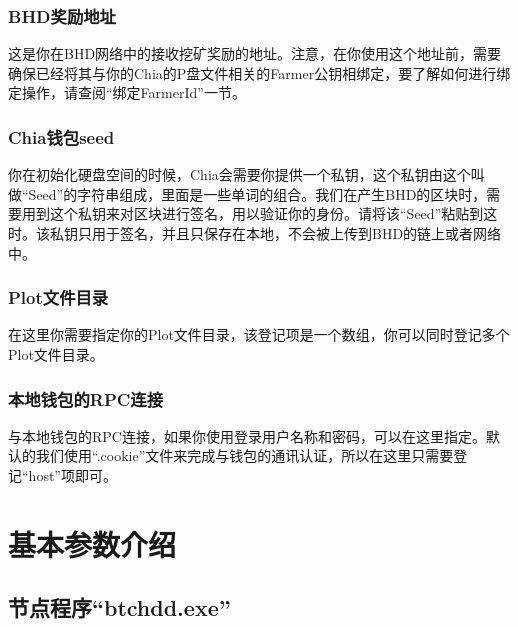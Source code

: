 \subsubsection{BHD奖励地址}
\begin{flushleft}
    这是你在BHD网络中的接收挖矿奖励的地址。注意，在你使用这个地址前，需要确保已经将其与你的Chia的P盘文件相关的Farmer公钥相绑定，要了解如何进行绑定操作，请查阅``绑定FarmerId''一节。
\end{flushleft}
\subsubsection{Chia钱包seed}
\begin{flushleft}
    你在初始化硬盘空间的时候，Chia会需要你提供一个私钥，这个私钥由这个叫做``Seed''的字符串组成，里面是一些单词的组合。我们在产生BHD的区块时，需要用到这个私钥来对区块进行签名，用以验证你的身份。请将该``Seed''粘贴到这时。该私钥只用于签名，并且只保存在本地，不会被上传到BHD的链上或者网络中。
\end{flushleft}
\subsubsection{Plot文件目录}
\begin{flushleft}
    在这里你需要指定你的Plot文件目录，该登记项是一个数组，你可以同时登记多个Plot文件目录。
\end{flushleft}
\subsubsection{本地钱包的RPC连接}
\begin{flushleft}
    与本地钱包的RPC连接，如果你使用登录用户名称和密码，可以在这里指定。默认的我们使用``.cookie''文件来完成与钱包的通讯认证，所以在这里只需要登记``host''项即可。
\end{flushleft}
\section{基本参数介绍}
\subsection{节点程序``btchdd.exe''}
